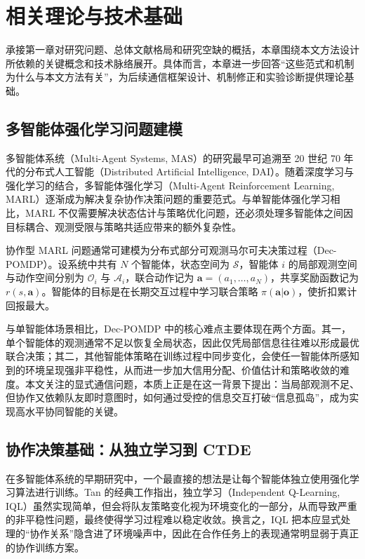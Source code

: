 \chapter{相关理论与技术基础}

承接第一章对研究问题、总体文献格局和研究空缺的概括，本章围绕本文方法设计所依赖的关键概念和技术脉络展开。具体而言，本章进一步回答“这些范式和机制为什么与本文方法有关”，为后续通信框架设计、机制修正和实验诊断提供理论基础。

\section{多智能体强化学习问题建模}

多智能体系统（Multi-Agent Systems, MAS）的研究最早可追溯至 20 世纪 70 年代的分布式人工智能（Distributed Artificial Intelligence, DAI）。随着深度学习与强化学习的结合，多智能体强化学习（Multi-Agent Reinforcement Learning, MARL）逐渐成为解决复杂协作决策问题的重要范式。与单智能体强化学习相比，MARL 不仅需要解决状态估计与策略优化问题，还必须处理多智能体之间因目标耦合、观测受限与策略共适应带来的额外复杂性。

协作型 MARL 问题通常可建模为分布式部分可观测马尔可夫决策过程（Dec-POMDP）。设系统中共有 $N$ 个智能体，状态空间为 $\mathcal{S}$，智能体 $i$ 的局部观测空间与动作空间分别为 $\mathcal{O}_i$ 与 $\mathcal{A}_i$，联合动作记为 $\mathbf{a}=(a_1,\ldots,a_N)$，共享奖励函数记为 $r(s,\mathbf{a})$。智能体的目标是在长期交互过程中学习联合策略 $\pi(\mathbf{a}|\mathbf{o})$，使折扣累计回报最大。

与单智能体场景相比，Dec-POMDP 中的核心难点主要体现在两个方面。其一，单个智能体的观测通常不足以恢复全局状态，因此仅凭局部信息往往难以形成最优联合决策；其二，其他智能体策略在训练过程中同步变化，会使任一智能体所感知到的环境呈现强非平稳性，从而进一步加大信用分配、价值估计和策略收敛的难度。本文关注的显式通信问题，本质上正是在这一背景下提出：当局部观测不足、但协作又依赖队友即时意图时，如何通过受控的信息交互打破“信息孤岛”，成为实现高水平协同智能的关键。

\section{协作决策基础：从独立学习到 CTDE}

在多智能体系统的早期研究中，一个最直接的想法是让每个智能体独立使用强化学习算法进行训练。Tan 的经典工作指出，独立学习（Independent Q-Learning, IQL）虽然实现简单，但会将队友策略变化视为环境变化的一部分，从而导致严重的非平稳性问题，最终使得学习过程难以稳定收敛\cite{tan1993iql}。换言之，IQL 把本应显式处理的“协作关系”隐含进了环境噪声中，因此在合作任务上的表现通常明显弱于真正的协作训练方案。

